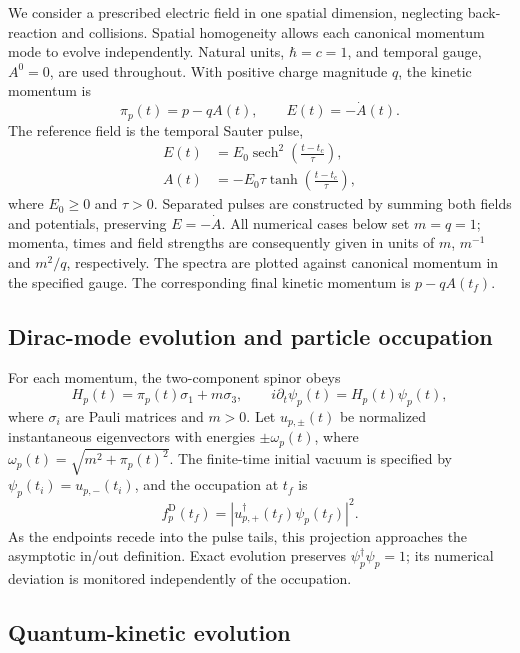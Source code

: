 \documentclass[anonymous]{iopjournal}
\newcommand{\sech}{\operatorname{sech}}
\begin{document}
We consider a prescribed electric field in one spatial dimension, neglecting back-reaction and collisions. Spatial homogeneity allows each canonical momentum mode to evolve independently. Natural units, $\hbar=c=1$, and temporal gauge, $A^0=0$, are used throughout. With positive charge magnitude $q$, the kinetic momentum is
\begin{equation}
  \pi_p(t)=p-qA(t), \qquad E(t)=-\dot A(t).
  \label{eq:kinetic}
\end{equation}
The reference field is the temporal Sauter pulse,
\begin{align}
  E(t)&=E_0\sech^2\!\left(\frac{t-t_c}{\tau}\right),\nonumber\\
  A(t)&=-E_0\tau\tanh\!\left(\frac{t-t_c}{\tau}\right),
  \label{eq:sauter}
\end{align}
where $E_0\geq0$ and $\tau>0$. Separated pulses are constructed by summing both fields and potentials, preserving $E=-\dot A$. All numerical cases below set $m=q=1$; momenta, times and field strengths are consequently given in units of $m$, $m^{-1}$ and $m^2/q$, respectively. The spectra are plotted against canonical momentum in the specified gauge. The corresponding final kinetic momentum is $p-qA(t_f)$.

\subsection{Dirac-mode evolution and particle occupation}

For each momentum, the two-component spinor obeys
\begin{equation}
  H_p(t)=\pi_p(t)\sigma_1+m\sigma_3, \qquad
  i\partial_t\psi_p(t)=H_p(t)\psi_p(t),
  \label{eq:dirac}
\end{equation}
where $\sigma_i$ are Pauli matrices and $m>0$. Let $u_{p,\pm}(t)$ be normalized instantaneous eigenvectors with energies $\pm\omega_p(t)$, where $\omega_p(t)=\sqrt{m^2+\pi_p(t)^2}$. The finite-time initial vacuum is specified by $\psi_p(t_i)=u_{p,-}(t_i)$, and the occupation at $t_f$ is
\begin{equation}
  f_p^{\mathrm D}(t_f)=\left|u_{p,+}^{\dagger}(t_f)\psi_p(t_f)\right|^2.
  \label{eq:occupation}
\end{equation}
As the endpoints recede into the pulse tails, this projection approaches the asymptotic in/out definition. Exact evolution preserves $\psi_p^\dagger\psi_p=1$; its numerical deviation is monitored independently of the occupation.

\subsection{Quantum-kinetic evolution}
\end{document}
